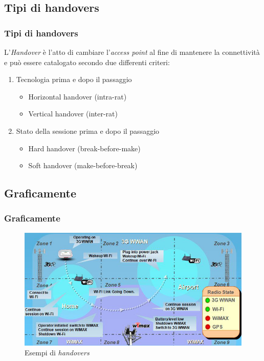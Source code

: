 \documentclass[10pt]{beamer}
\begin{document}
\subsection{Tipi di handovers}
\begin{frame}
\frametitle{Tipi di handovers}
L'{\em Handover} è l'atto di cambiare l'{\em access point} al fine di mantenere la connettività e può essere catalogato secondo due differenti criteri:
\begin{enumerate}
\item Tecnologia prima e dopo il passaggio
\begin{itemize}
\item Horizontal handover (intra-rat)
\item Vertical handover (inter-rat)
\end{itemize}

\item Stato della sessione prima e dopo il passaggio
\begin{itemize}
\item Hard handover (break-before-make)
\item Soft handover (make-before-break)
\end{itemize}
\end{enumerate}
\end{frame}

\subsection{Graficamente}
\begin{frame}
\frametitle{Graficamente}
\begin{figure}[h!]
\centering
\includegraphics[scale=0.4]{handovers.jpg}
\caption{Esempi di {\em handovers}}
\label{fig:handovers}
\end{figure}
\end{frame}
\end{document}
